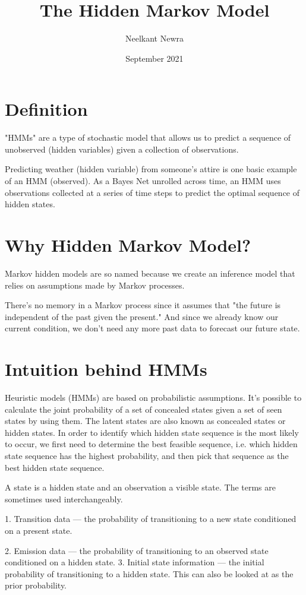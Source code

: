 \documentclass{article}
\title{The Hidden Markov Model}
\author{Neelkant Newra}
\date{September 2021}
\begin{document}
\maketitle

\section*{Definition}
"HMMs" are a type of stochastic model that allows us to predict a sequence of unobserved (hidden variables) given a collection of observations.

Predicting weather (hidden variable) from someone's attire is one basic example of an HMM (observed). As a Bayes Net unrolled across time, an HMM uses observations collected at a series of time steps to predict the optimal sequence of hidden states.

\section*{Why Hidden Markov Model?}
Markov hidden models are so named because we create an inference model that relies on assumptions made by Markov processes.

There's no memory in a Markov process since it assumes that "the future is independent of the past given the present." And since we already know our current condition, we don't need any more past data to forecast our future state.

\section*{Intuition behind HMMs}
Heuristic models (HMMs) are based on probabilistic assumptions. It's possible to calculate the joint probability of a set of concealed states given a set of seen states by using them. The latent states are also known as concealed states or hidden states. In order to identify which hidden state sequence is the most likely to occur, we first need to determine the best feasible sequence, i.e. which hidden state sequence has the highest probability, and then pick that sequence as the best hidden state sequence.

A state is a hidden state and an observation a visible state. The terms are sometimes used interchangeably.

1.	Transition data — the probability of transitioning to a new state conditioned on a present state.

2.	Emission data — the probability of transitioning to an observed state conditioned on a hidden state.
3.	Initial state information — the initial probability of transitioning to a hidden state. This can also be looked at as the prior probability.
\end{document}
